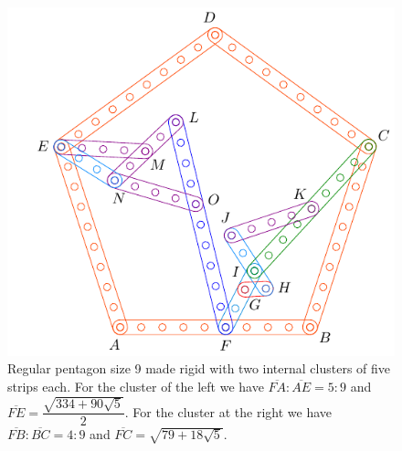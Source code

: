 \documentclass[11pt]{article}
\begin{document}
\begin{figure}[H]
 \centering
 \includegraphics[scale=0.9]{9/penta9b}
 \caption{Regular pentagon size 9 made rigid with two internal clusters of five strips each. For the cluster of the left we have $\overline{FA}:\overline{AE} = 5:9$ and $\overline{FE} = \dfrac{\sqrt{334 + 90\sqrt5}}2$. For the cluster at the right we have $\overline{FB}:\overline{BC} = 4:9$ and $\overline{FC}=\sqrt{79 + 18\sqrt5}$.}
 \label{fig:penta9b}
\end{figure}
\end{document}
